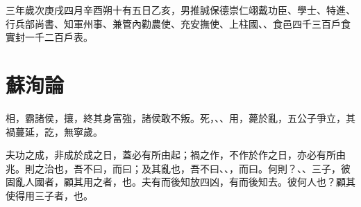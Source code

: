 三年歲次庚戌四月辛酉朔十有五日乙亥，男推誠保德崇仁翊戴功臣、學士、特進、行兵部尚書、知軍州事、兼管內勸農使、充安撫使、上柱國、、食邑四千三百戶食實封一千二百戶表。

\theendnotes

\section[管仲論\quad{\small 蘇洵}]{{\normalsize 蘇洵}\quad{}論}
相，霸諸侯，攘，終其身富強，諸侯敢不叛。死，、、用，薨於亂，五公子爭立，其禍蔓延，訖，無寧歲。

夫功之成，非成於成之日，蓋必有所由起；禍之作，不作於作之日，亦必有所由兆。{則}之治也，吾不曰，而曰；及其亂也，吾不曰、、，而曰。何則？、、三子，彼固亂人國者，顧其用之者，也。夫有而後知放四凶，有而後知去。彼何人也？顧其使得用三子者，也。

